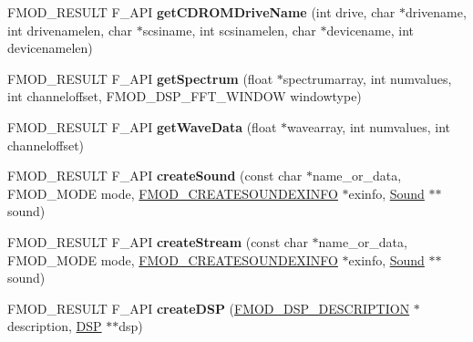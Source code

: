 \begin{DoxyCompactItemize}
\item 
F\+M\+O\+D\+\_\+\+R\+E\+S\+U\+LT F\+\_\+\+A\+PI {\bfseries get\+C\+D\+R\+O\+M\+Drive\+Name} (int drive, char $\ast$drivename, int drivenamelen, char $\ast$scsiname, int scsinamelen, char $\ast$devicename, int devicenamelen)\hypertarget{class_f_m_o_d_1_1_system_a88d949c50355f054c2363b17b8723e72}{}\label{class_f_m_o_d_1_1_system_a88d949c50355f054c2363b17b8723e72}

\item 
F\+M\+O\+D\+\_\+\+R\+E\+S\+U\+LT F\+\_\+\+A\+PI {\bfseries get\+Spectrum} (float $\ast$spectrumarray, int numvalues, int channeloffset, F\+M\+O\+D\+\_\+\+D\+S\+P\+\_\+\+F\+F\+T\+\_\+\+W\+I\+N\+D\+OW windowtype)\hypertarget{class_f_m_o_d_1_1_system_a6ce8950d031e5c213d85e9c9b04bc201}{}\label{class_f_m_o_d_1_1_system_a6ce8950d031e5c213d85e9c9b04bc201}

\item 
F\+M\+O\+D\+\_\+\+R\+E\+S\+U\+LT F\+\_\+\+A\+PI {\bfseries get\+Wave\+Data} (float $\ast$wavearray, int numvalues, int channeloffset)\hypertarget{class_f_m_o_d_1_1_system_a5a28459b7c9b3d5023001ec5c96b2bf9}{}\label{class_f_m_o_d_1_1_system_a5a28459b7c9b3d5023001ec5c96b2bf9}

\item 
F\+M\+O\+D\+\_\+\+R\+E\+S\+U\+LT F\+\_\+\+A\+PI {\bfseries create\+Sound} (const char $\ast$name\+\_\+or\+\_\+data, F\+M\+O\+D\+\_\+\+M\+O\+DE mode, \hyperlink{struct_f_m_o_d___c_r_e_a_t_e_s_o_u_n_d_e_x_i_n_f_o}{F\+M\+O\+D\+\_\+\+C\+R\+E\+A\+T\+E\+S\+O\+U\+N\+D\+E\+X\+I\+N\+FO} $\ast$exinfo, \hyperlink{class_f_m_o_d_1_1_sound}{Sound} $\ast$$\ast$sound)\hypertarget{class_f_m_o_d_1_1_system_aca0782c1d367a54ddf00aea484971735}{}\label{class_f_m_o_d_1_1_system_aca0782c1d367a54ddf00aea484971735}

\item 
F\+M\+O\+D\+\_\+\+R\+E\+S\+U\+LT F\+\_\+\+A\+PI {\bfseries create\+Stream} (const char $\ast$name\+\_\+or\+\_\+data, F\+M\+O\+D\+\_\+\+M\+O\+DE mode, \hyperlink{struct_f_m_o_d___c_r_e_a_t_e_s_o_u_n_d_e_x_i_n_f_o}{F\+M\+O\+D\+\_\+\+C\+R\+E\+A\+T\+E\+S\+O\+U\+N\+D\+E\+X\+I\+N\+FO} $\ast$exinfo, \hyperlink{class_f_m_o_d_1_1_sound}{Sound} $\ast$$\ast$sound)\hypertarget{class_f_m_o_d_1_1_system_accec6ee2c51fccf5091098658b65491c}{}\label{class_f_m_o_d_1_1_system_accec6ee2c51fccf5091098658b65491c}

\item 
F\+M\+O\+D\+\_\+\+R\+E\+S\+U\+LT F\+\_\+\+A\+PI {\bfseries create\+D\+SP} (\hyperlink{struct_f_m_o_d___d_s_p___d_e_s_c_r_i_p_t_i_o_n}{F\+M\+O\+D\+\_\+\+D\+S\+P\+\_\+\+D\+E\+S\+C\+R\+I\+P\+T\+I\+ON} $\ast$description, \hyperlink{class_f_m_o_d_1_1_d_s_p}{D\+SP} $\ast$$\ast$dsp)\hypertarget{class_f_m_o_d_1_1_system_a9e14998873b05d52108096d92b7994bd}{}\label{class_f_m_o_d_1_1_system_a9e14998873b05d52108096d92b7994bd}


\end{DoxyCompactItemize}
